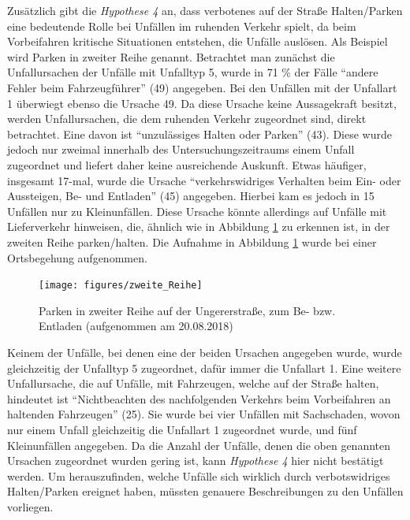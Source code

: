 Zusätzlich gibt die \textit{Hypothese 4} an, dass verbotenes auf der Straße Halten/Parken eine bedeutende Rolle bei Unfällen im ruhenden Verkehr spielt, da beim Vorbeifahren kritische Situationen entstehen, die Unfälle auslösen. Als Beispiel wird Parken in zweiter Reihe genannt. Betrachtet man zunächst die Unfallursachen der Unfälle mit Unfalltyp 5, wurde in 71 \% der Fälle \enquote{andere Fehler beim Fahrzeugführer} (49) angegeben. Bei den Unfällen mit der Unfallart 1 überwiegt ebenso die Ursache 49. Da diese Ursache keine Aussagekraft besitzt, werden Unfallursachen, die dem ruhenden Verkehr zugeordnet sind, direkt betrachtet. Eine davon ist \enquote{unzulässiges Halten oder Parken} (43). Diese wurde jedoch nur zweimal innerhalb des Untersuchungszeitraums einem Unfall zugeordnet und liefert daher keine ausreichende Auskunft. Etwas häufiger, insgesamt 17-mal, wurde die Ursache \enquote{verkehrswidriges Verhalten beim Ein- oder Aussteigen, Be- und Entladen} (45) angegeben. Hierbei kam es jedoch in 15 Unfällen nur zu Kleinunfällen. Diese Ursache könnte allerdings auf Unfälle mit Lieferverkehr hinweisen, die, ähnlich wie in Abbildung \ref{fig:Parken_zweite_Reihe} zu erkennen ist, in der zweiten Reihe parken/halten. Die Aufnahme in Abbildung \ref{fig:Parken_zweite_Reihe} wurde bei einer Ortsbegehung aufgenommen.

\begin{savenotes}
	\begin{figure}[H]
		\centering
		\texttt{[image: figures/zweite\_Reihe]}
		\caption[Parken in zweiter Reihe auf der Ungererstraße, zum Be- bzw. Entladen]{Parken in zweiter Reihe auf der Ungererstraße, zum Be- bzw. Entladen (aufgenommen am 20.08.2018)}\label{fig:Parken_zweite_Reihe}
	\end{figure}
\end{savenotes}

Keinem der Unfälle, bei denen eine der beiden Ursachen angegeben wurde, wurde gleichzeitig der Unfalltyp 5 zugeordnet, dafür immer die Unfallart 1. Eine weitere Unfallursache, die auf Unfälle, mit Fahrzeugen, welche auf der Straße halten, hindeutet ist \enquote{Nichtbeachten des nachfolgenden Verkehrs beim Vorbeifahren an haltenden Fahrzeugen} (25). Sie wurde bei vier Unfällen mit Sachschaden, wovon nur einem Unfall gleichzeitig die Unfallart 1 zugeordnet wurde, und fünf Kleinunfällen angegeben. Da die Anzahl der Unfälle, denen die oben genannten Ursachen zugeordnet wurden gering ist, kann \textit{Hypothese 4} hier nicht bestätigt werden. Um herauszufinden, welche Unfälle sich wirklich durch verbotswidriges Halten/Parken ereignet haben, müssten genauere Beschreibungen zu den Unfällen vorliegen. %

